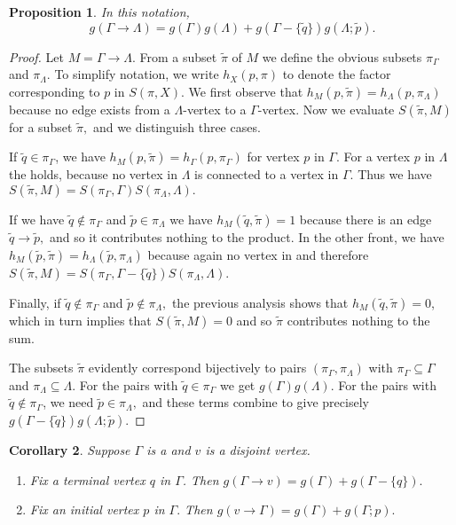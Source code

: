 \documentclass[draft]{article}
\newcommand{\qo}{\tilde{q}}
\newcommand{\pin}{\tilde{p}}
\newcommand{\tilpi}{\tilde{\pi}}
\newcommand{\piga}{\pi_\Gamma}
\newcommand{\pila}{\pi_\Lambda}
\theoremstyle{plain}
\newtheorem{prop}{Proposition}[section]
\newtheorem{cor}[prop]{Corollary}
\theoremstyle{definition}
\begin{document}
\begin{prop}
	In this notation, \eqnspace \begin{equation*} g(\Gamma \rightarrow \Lambda) = g(\Gamma)g(\Lambda) + g(\Gamma - \{\qo\})g(\Lambda; \pin). \end{equation*}
\end{prop}
\begin{proof}
	Let $M = \Gamma \rightarrow \Lambda.$ From a subset $\tilpi$ of $M$ we define the obvious subsets $\piga$ and $\pila.$ To simplify notation, we write $h_X(p, \pi)$ to denote the factor corresponding to $p$ in $S(\pi, X).$ We first observe that $h_M(p, \tilpi) = h_\Lambda(p, \pila)$ because no edge exists from a $\Lambda$-vertex to a $\Gamma$-vertex. Now we evaluate $S(\tilpi, M)$ for a subset $\tilpi,$ and we distinguish three cases.
	
	
	If $\qo \in \piga$, we have $h_M(p, \tilpi) = h_\Gamma(p, \piga)$ for vertex $p$ in $\Gamma$. For a vertex $p$ in $\Lambda$ the holds, because no vertex in $\Lambda$ is connected to a vertex in $\Gamma$. Thus we have $S(\tilpi, M) = S(\piga, \Gamma)S(\pila, \Lambda).$
	
	If we have $\qo\notin\piga$ and $\pin \in \pila$ we have $h_M(\qo, \tilpi) = 1$ because there is an edge $\qo \rightarrow \pin,$ and so it contributes nothing to the product. In the other front, we have $h_M(\pin, \tilpi) = h_\Lambda(\pin, \pila)$ because again no vertex in and therefore $S(\tilpi, M) = S(\piga, \Gamma - \{\qo\})S(\pila, \Lambda)$.
	
	Finally, if $\qo \notin \piga$ and $\pin\notin\pila,$ the previous analysis shows that $h_M(\qo, \tilpi) = 0$, which in turn implies that $S(\tilpi, M) = 0$ and so $\tilpi$ contributes nothing to the sum.
	
	The subsets $\tilpi$ evidently correspond bijectively to pairs $(\piga, \pila)$ with $\piga \subseteq \Gamma$ and $\pila \subseteq \Lambda.$ For the pairs with $\qo \in \piga$ we get $g(\Gamma)g(\Lambda)$. For the pairs with $\qo \notin \piga$, we need $\pin \in \pila,$ and these terms combine to give precisely $g(\Gamma - \{\qo\})g(\Lambda; \pin).$
\end{proof}

\begin{cor} Suppose $\Gamma$ is a \hg[1] and $v$ is a disjoint vertex.\listspace
	\begin{enumerate} \listspace
		\item Fix a terminal vertex $q$ in $\Gamma$. Then $g(\Gamma \rightarrow v) = g(\Gamma) + g(\Gamma - \{q\}).$
		\item Fix an initial vertex $p$ in $\Gamma.$ Then $g(v \rightarrow \Gamma) = g(\Gamma) + g(\Gamma; p).$
	\end{enumerate}\textspace
\end{cor}
\end{document}
